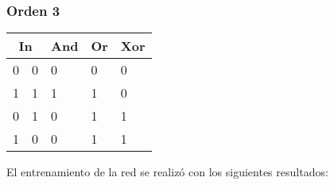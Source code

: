 
\subsubsection{Orden 3}
\begin{table}[H]
    \centering
    \begin{tabular}{|ll|l|l|l|}
    \hline
    \multicolumn{2}{|c|}{\textbf{In}} & \multicolumn{1}{c|}{\textbf{And}} & \multicolumn{1}{c|}{\textbf{Or}} & \multicolumn{1}{c|}{\textbf{Xor}} \\ \hline
    \multicolumn{1}{|l|}{0}    & 0    & 0                                 & 0                                & 0                                 \\ \hline
    \multicolumn{1}{|l|}{1}    & 1    & 1                                 & 1                                & 0                                 \\ \hline
    \multicolumn{1}{|l|}{0}    & 1    & 0                                 & 1                                & 1                                 \\ \hline
    \multicolumn{1}{|l|}{1}    & 0    & 0                                 & 1                                & 1                                 \\ \hline
    \end{tabular}
\end{table}
El entrenamiento de la red se realizó con los siguientes resultados:
